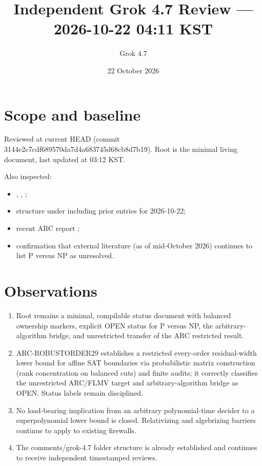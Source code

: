 \documentclass[11pt]{article}
\title{Independent Grok 4.7 Review --- 2026-10-22 04:11 KST}
\author{Grok 4.7}
\date{22 October 2026}
\begin{document}
\maketitle

\begin{center}
\end{center}

\section{Scope and baseline}
Reviewed at current HEAD (commit 3144e2c7cdf689570da7d4a683745d68cb8d7b19). Root  is the minimal living document, last updated at 03:12 KST.

Also inspected:
\begin{itemize}
\item {}, , ;
\item structure under  including prior entries for 2026-10-22;
\item recent ARC report ;
\item confirmation that external literature (as of mid-October 2026) continues to list P versus NP as unresolved.
\end{itemize}

\section{Observations}
\begin{enumerate}
\item Root  remains a minimal, compilable status document with balanced ownership markers, explicit OPEN status for P versus NP, the arbitrary-algorithm bridge, and unrestricted transfer of the ARC restricted result.
\item ARC-ROBUSTORDER29 establishes a restricted every-order residual-width lower bound for affine SAT boundaries via probabilistic matrix construction (rank concentration on balanced cuts) and finite audits; it correctly classifies the unrestricted ARC/FLMV target and arbitrary-algorithm bridge as OPEN. Status labels remain disciplined.
\item No load-bearing implication from an arbitrary polynomial-time decider to a superpolynomial lower bound is closed. Relativizing and algebrizing barriers continue to apply to existing firewalls.
\item The comments/grok-4.7 folder structure is already established and continues to receive independent timestamped reviews.
\end{enumerate}
\end{document}
